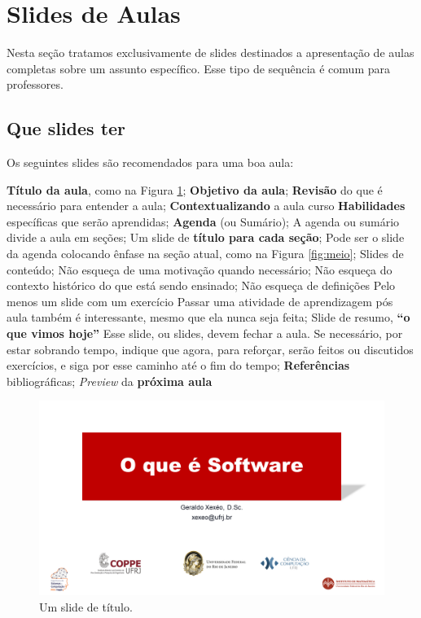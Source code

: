 \section{Slides de Aulas}

Nesta seção tratamos exclusivamente de slides destinados a apresentação de aulas completas sobre um assunto específico. Esse tipo de sequência é comum para professores.

\subsection{Que slides ter}

Os seguintes slides são recomendados para uma boa aula:
\begin{outline}
    \1 \textbf{Título da aula}, como na Figura \ref{fig:titulo};
    \1 \textbf{Objetivo da aula};
    \1 \textbf{Revisão} do que é necessário para entender a aula;
    \2 \textbf{Contextualizando} a aula curso
    \1 \textbf{Habilidades} específicas que serão aprendidas;
    \1 \textbf{Agenda} (ou Sumário);
    \2 A agenda ou sumário divide a aula em seções;
    \1 Um slide de \textbf{título para cada seção};
    \2 Pode ser o slide da agenda colocando ênfase na seção atual, como na Figura \ref{fig:meio};
    \1 Slides de conteúdo;
    \2 Não esqueça de uma motivação quando necessário;
    \2 Não esqueça do contexto histórico do que está sendo ensinado;
    \2 Não esqueça de definições
    \1 Pelo menos um slide com um exercício
    \2 Passar uma atividade de aprendizagem pós aula também é interessante, mesmo que ela nunca seja feita;
    \1 Slide de resumo, \textbf{``o que vimos hoje''}
    \2 Esse slide, ou slides, devem fechar a aula. Se necessário, por estar sobrando tempo, indique que agora, para reforçar, serão feitos ou discutidos exercícios, e siga por esse caminho até o fim do tempo;
    \1 \textbf{Referências} bibliográficas;
    \1 \textit{Preview} da \textbf{próxima aula}
\end{outline}



\begin{figure}[ht]
    \centering
    \includegraphics[width=\tam\linewidth]{imagens/capa.png}
    \caption{Um slide de título.}
    \label{fig:titulo}
\end{figure}

